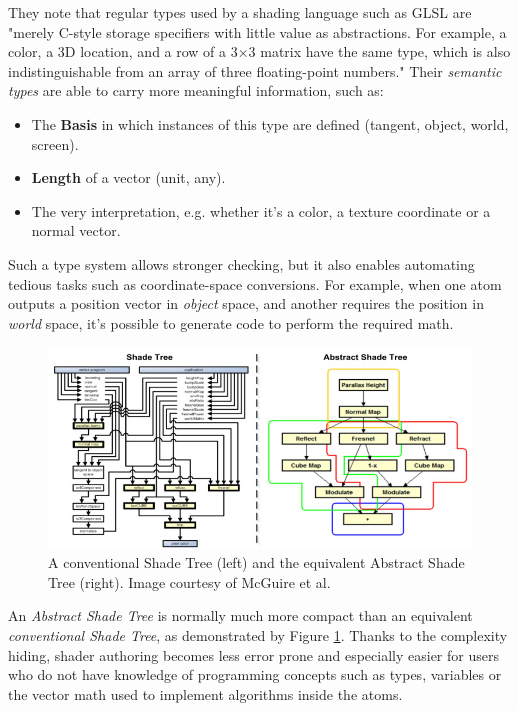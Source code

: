 They note that regular types used by a shading language such as GLSL are "merely C-style storage specifiers with little value as abstractions. For example, a color, a 3D location, and a row of a 3×3 matrix have the same type, which is also indistinguishable from an array of three floating-point numbers." Their \emph{semantic types} are able to carry more meaningful information, such as:
\begin{itemize}
\item The \textbf{Basis} in which instances of this type are defined (tangent, object, world, screen).
\item \textbf{Length} of a vector (unit, any).
\item The very interpretation, e.g. whether it’s a color, a texture coordinate or a normal vector.
\end{itemize}

Such a type system allows stronger checking, but it also enables automating tedious tasks such as coordinate-space conversions. For example, when one atom outputs a position vector in \emph{object} space, and another requires the position in \emph{world} space, it's possible to generate code to perform the required math.

\begin{figure}[h!]
  \centering
    \includegraphics[width=0.9\linewidth]{./Chapters/AbstractShadeTree.jpg}
    \caption[Abstract Shade Tree]{A conventional Shade Tree (left) and the equivalent Abstract Shade Tree (right). Image courtesy of McGuire et al.}
  \label{fig:AbstractShadeTree}
\end{figure}

An \emph{Abstract Shade Tree} is normally much more compact than an equivalent \emph{conventional Shade Tree}, as demonstrated by Figure \ref{fig:AbstractShadeTree}. Thanks to the complexity hiding, shader authoring becomes less error prone and especially easier for users who do not have knowledge of programming concepts such as types, variables or the vector math used to implement algorithms inside the atoms.
 
